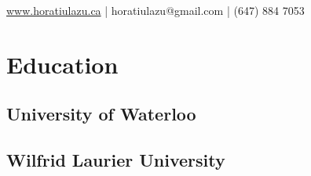 \documentclass[]{deedy-resume-openfont}
\begin{document}
%
%

%
%


 { \url{www.horatiulazu.ca} | horatiulazu@gmail.com | \href{mailto:horatiulazu@gmail.com}{} (647) 884 7053
}

%
%

\begin{minipage}[t]{0.33\textwidth} 


\section{Education} 

\subsection{University of Waterloo}
\sectionsep
\vspace{2mm}

\subsection{Wilfrid Laurier University}
\sectionsep




\end{minipage}
\end{document}
